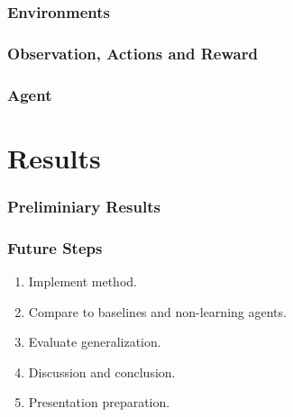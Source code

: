 \documentclass{beamer}
\begin{document}
\begin{frame}
    \frametitle{Environments}
\end{frame}

\begin{frame}
    \frametitle{Observation, Actions and Reward}
\end{frame}

\begin{frame}
    \frametitle{Agent}
\end{frame}


\section{Results}

\begin{frame}
    \frametitle{Preliminiary Results}
\end{frame}

\begin{frame}
    \frametitle{Future Steps}

    \begin{enumerate}
        \item Implement method.
        \item Compare to baselines and non-learning agents.
        \item Evaluate generalization.
        \item Discussion and conclusion.
        \item Presentation preparation.
    \end{enumerate}
\end{frame}
\end{document}
